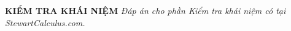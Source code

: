 \vspace{7pt}

\noindent
{\fontsize{10}{12}\selectfont\textbf{\textsf{\color{stewartcyan}KIỂM TRA KHÁI NIỆM}}}%
\hfill
{\footnotesize\textit{Đáp án cho phần Kiểm tra khái niệm có tại StewartCalculus.com.}}
\par\vspace{2pt}
\noindent{\color{stewartcyan}\rule{\textwidth}{0.8pt}}

\vspace{7pt}

\noindent
